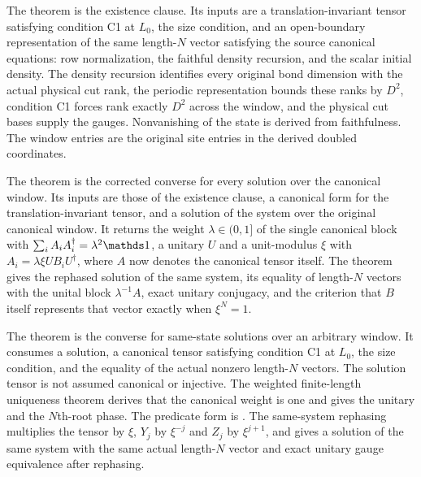 \documentclass{article}
\begin{document}
The theorem
is the existence clause. Its inputs are a translation-invariant tensor
satisfying condition C1 at $L_0$, the size condition, and an open-boundary
representation of the same length-$N$ vector satisfying the source canonical
equations: row normalization, the faithful density recursion, and the scalar
initial density. The density recursion identifies every original bond
dimension with the actual physical cut rank, the periodic representation
bounds these ranks by $D^2$, condition C1 forces rank exactly $D^2$ across the
window, and the physical cut bases supply the gauges. Nonvanishing of the
state is derived from faithfulness. The window entries are the original site
entries in the derived doubled coordinates.

The theorem
is the corrected converse for every solution over the canonical window. Its
inputs are those of the existence clause, a canonical form for the
translation-invariant tensor, and a solution of the system over the original
canonical window. It returns the weight $\lambda\in(0,1]$ of the single
canonical block with $\sum_iA_iA_i^\dagger=\lambda^2\Id$, a unitary $U$ and a
unit-modulus $\xi$ with $A_i=\lambda\xi UB_iU^\dagger$, where $A$ now denotes
the canonical tensor itself. The theorem
gives the rephased solution of the same system, its equality of length-$N$
vectors with the unital block $\lambda^{-1}A$, exact unitary conjugacy, and
the criterion that $B$ itself represents that vector exactly when $\xi^N=1$.

The theorem
is the converse for same-state solutions over an arbitrary window. It consumes a solution, a canonical
tensor satisfying condition C1 at $L_0$, the size condition, and the equality
of the actual nonzero length-$N$ vectors. The solution tensor is not assumed
canonical or injective. The weighted finite-length uniqueness theorem derives
that the canonical weight is one and gives the unitary and the $N$th-root
phase. The predicate form is
.
The same-system rephasing
multiplies the tensor by $\xi$, $Y_j$ by $\xi^{-j}$ and $Z_j$ by $\xi^{j+1}$,
and
gives a solution of the same system with the same actual length-$N$ vector and
exact unitary gauge equivalence after rephasing.
\end{document}
